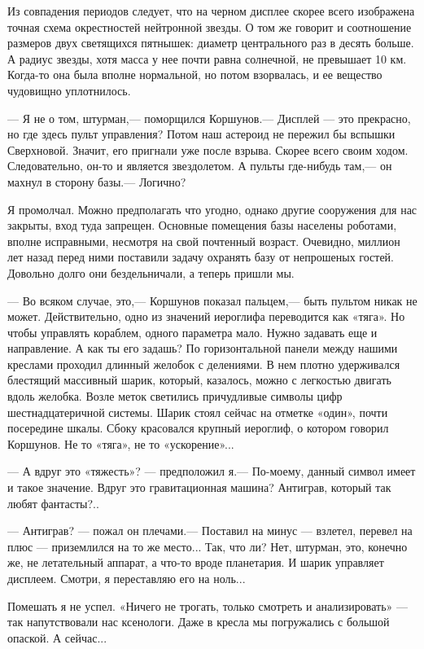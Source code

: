 \documentclass[11pt,a4paper,oneside]{article}
\begin{document}
Из совпадения периодов следует, что на черном дисплее скорее всего изображена точная схема окрестностей нейтронной звезды. О том же говорит и соотношение размеров двух светящихся пятнышек: диаметр центрального раз в десять больше. А радиус звезды, хотя масса у нее почти равна солнечной, не превышает 10 км. Когда-то она была вполне нормальной, но потом взорвалась, и ее вещество чудовищно уплотнилось.

— Я не о том, штурман,— поморщился Коршунов.— Дисплей — это прекрасно, но где здесь пульт управления? Потом наш астероид не пережил бы вспышки Сверхновой. Значит, его пригнали уже после взрыва. Скорее всего своим ходом. Следовательно, он-то и является звездолетом. А пульты где-нибудь там,— он махнул в сторону базы.— Логично?

Я промолчал. Можно предполагать что угодно, однако другие сооружения для нас закрыты, вход туда запрещен. Основные помещения базы населены роботами, вполне исправными, несмотря на свой почтенный возраст. Очевидно, миллион лет назад перед ними поставили задачу охранять базу от непрошеных гостей. Довольно долго они бездельничали, а теперь пришли мы.

— Во всяком случае, это,— Коршунов показал пальцем,— быть пультом никак не может. Действительно, одно из значений иероглифа переводится как «тяга». Но чтобы управлять кораблем, одного параметра мало. Нужно задавать еще и направление. А как ты его задашь?
По горизонтальной панели между нашими креслами проходил длинный желобок с делениями. В нем плотно удерживался блестящий массивный шарик, который, казалось, можно с легкостью двигать вдоль желобка. Возле меток светились причудливые символы цифр шестнадцатеричной системы. Шарик стоял сейчас на отметке «один», почти посередине шкалы. Сбоку красовался крупный иероглиф, о котором говорил Коршунов. Не то «тяга», не то «ускорение»...

— А вдруг это «тяжесть»? — предположил я.— По-моему, данный символ имеет и такое значение. Вдруг это гравитационная машина? Антиграв, который так любят фантасты?..

— Антиграв? — пожал он плечами.— Поставил на минус — взлетел, перевел на плюс — приземлился на то же место... Так, что ли? Нет, штурман, это, конечно же, не летательный аппарат, а что-то вроде планетария. И шарик управляет дисплеем. Смотри, я переставляю его на ноль...

Помешать я не успел. «Ничего не трогать, только смотреть и анализировать» — так напутствовали нас ксенологи. Даже в кресла мы погружались с большой опаской. А сейчас...
\end{document}
